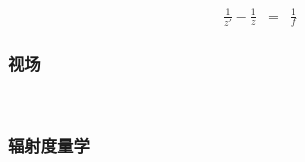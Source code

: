 \documentclass{beamer}
\begin{document}
{{{{\begin{frame}
  {\hspace{4em}}
  \begin{eqnarray*}
    \frac{1}{z'} - \frac{1}{z} & = & \frac{1}{f}
  \end{eqnarray*}
\end{frame}}{\begin{frame}
  \frametitle{视场}
  
  \
  
\end{frame}}{\begin{frame}
  \frametitle{辐射度量学}
  

\end{frame}}}}}
\end{document}
